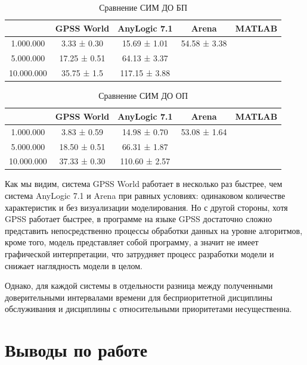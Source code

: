 \documentclass[a4paper,14pt]{report} %
\begin{document}
\begin{table}[h!]
\caption{Сравнение СИМ ДО БП}
\begin{tabular}{|c|c|c|c|c|}
\hline
 & GPSS World & AnyLogic 7.1  &  Arena & MATLAB\\
\hline
1.000.000 & 3.33 ± 0.30 & 15.69 ± 1.01 & 54.58 ± 3.38 &\\
\hline
5.000.000 & 17.25 ± 0.51 & 64.13 ± 3.37 & & \\
\hline
10.000.000 & 35.75 ± 1.5 & 117.15 ± 3.88 & & \\
\hline
\end{tabular}
\end{table} 

\begin{table}[h!]
\caption{Сравнение СИМ ДО ОП}
\begin{tabular}{|c|c|c|c|c|}
\hline
 & GPSS World & AnyLogic 7.1 & Arena & MATLAB \\
\hline
1.000.000 & 3.83 ± 0.59 & 14.98 ± 0.70 & 53.08 ± 1.64 & \\
\hline
5.000.000 & 18.50 ± 0.51 & 66.31 ± 1.87 &  & \\
\hline
10.000.000 & 37.33 ± 0.30 & 110.60 ± 2.57&   &\\
\hline
\end{tabular}
\end{table} 

Как мы видим, система GPSS World работает в несколько раз быстрее, чем система AnyLogic 7.1 и Arena при равных условиях: одинаковом количестве характеристик и без визуализации моделирования. Но с другой стороны, хотя GPSS работает быстрее, в программе на языке GPSS достаточно сложно представить непосредственно процессы обработки данных на уровне алгоритмов, кроме того, модель представляет собой программу, а значит не имеет графической интерпретации, что затрудняет процесс разработки модели и снижает наглядность модели в целом.

Однако, для каждой системы в отдельности разница между полученными доверительными интервалами времени для бесприоритетной дисциплины обслуживания и дисциплины с относительными приоритетами несущественна.
\chapter{Выводы по работе}
\end{document}
